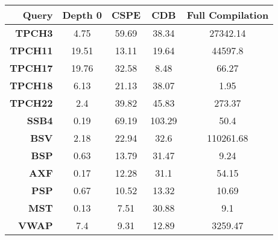 \begin{tabular}{|r|cccc|}\hline 
Query & Depth 0 & CSPE & CDB & Full Compilation\\ \hline 
{\bf TPCH3} & 4.75 & 59.69 & 38.34 & 27342.14\\ \hline 
{\bf TPCH11} & 19.51 & 13.11 & 19.64 & 44597.8\\ \hline 
{\bf TPCH17} & 19.76 & 32.58 & 8.48 & 66.27\\ \hline 
{\bf TPCH18} & 6.13 & 21.13 & 38.07 & 1.95\\ \hline 
{\bf TPCH22} & 2.4 & 39.82 & 45.83 & 273.37\\ \hline 
{\bf SSB4} & 0.19 & 69.19 & 103.29 & 50.4\\ \hline 
{\bf BSV} & 2.18 & 22.94 & 32.6 & 110261.68\\ \hline 
{\bf BSP} & 0.63 & 13.79 & 31.47 & 9.24\\ \hline 
{\bf AXF} & 0.17 & 12.28 & 31.1 & 54.15\\ \hline 
{\bf PSP} & 0.67 & 10.52 & 13.32 & 10.69\\ \hline 
{\bf MST} & 0.13 & 7.51 & 30.88 & 9.1\\ \hline 
{\bf VWAP} & 7.4 & 9.31 & 12.89 & 3259.47\\ \hline 
\end{tabular}
